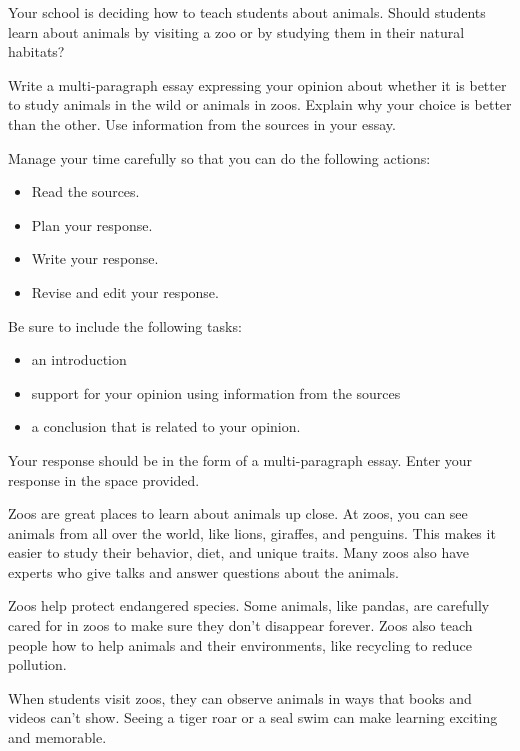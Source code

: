 \documentclass[12pt]{article}
\begin{document}
\vspace{1em}

\begin{tcolorbox}[colframe=black!60, colback=white, 
coltitle=black, colbacktitle=black!15, fonttitle=\bfseries\Large, 
title=Example Test Prompt, halign title=center, left=10pt, right=10pt, top=10pt, bottom=15pt]
Your school is deciding how to teach students about animals. Should students learn about animals by visiting a zoo or by studying them in their natural habitats?

\vspace{1em}


Write a multi-paragraph essay expressing your opinion about whether it is better to study animals in the wild or animals in zoos. Explain why your choice is better than the other. Use information from the sources in your essay.

Manage your time carefully so that you can do the following actions:
\begin{itemize}
    \item Read the sources.
    \item Plan your response.
    \item Write your response.
    \item Revise and edit your response.

\end{itemize}
Be sure to include the following tasks:
\begin{itemize}
    \item an introduction
    \item support for your opinion using information from the sources
    \item a conclusion that is related to your opinion.

\end{itemize}
Your response should be in the form of a multi-paragraph essay. Enter your response in the space provided.
     \end{tcolorbox}

\vspace{1em}

\begin{tcolorbox}[colframe=black!60, colback=white, 
coltitle=black, colbacktitle=black!15, fonttitle=\bfseries\Large, 
title=Source 1: Learning About Animals in Zoos, halign title=center, left=10pt, right=10pt, top=10pt, bottom=15pt]
Zoos are great places to learn about animals up close. At zoos, you can see animals from all over the world, like lions, giraffes, and penguins. This makes it easier to study their behavior, diet, and unique traits. Many zoos also have experts who give talks and answer questions about the animals. 

Zoos help protect endangered species. Some animals, like pandas, are carefully cared for in zoos to make sure they don’t disappear forever. Zoos also teach people how to help animals and their environments, like recycling to reduce pollution.

When students visit zoos, they can observe animals in ways that books and videos can’t show. Seeing a tiger roar or a seal swim can make learning exciting and memorable.
\end{tcolorbox}
\end{document}
